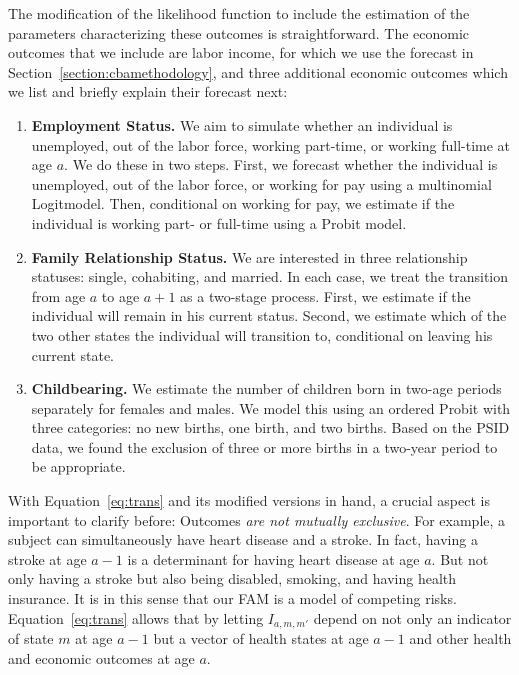 The modification of the likelihood function to include the estimation of the parameters characterizing these outcomes is straightforward. The economic outcomes that we include are labor income, for which we use the forecast in Section~\ref{section:cbamethodology}, and three additional economic outcomes which we list and briefly explain their forecast next:

\begin{enumerate}
\item \textbf{Employment Status.} We aim to simulate whether an individual is unemployed, out of the labor force, working part-time, or working full-time at age $a$. We do these in two steps. First, we forecast whether the individual is unemployed, out of
the labor force, or working for pay using a multinomial Logitmodel. Then, conditional on working for pay, we estimate if the individual is working part- or full-time using a Probit model.
\item \textbf{Family Relationship Status.} We are interested in three relationship statuses: single, cohabiting, and married. In each case, we treat the transition from age $a$ to age $a+1$ as a two-stage process. First, we estimate if the individual will remain in his current status. Second, we estimate which of the two other states the individual will transition to, conditional on leaving his current state.
\item \textbf{Childbearing.} We estimate the number of children born in two-age periods separately for females and males. We model this using an ordered Probit with three categories: no new births, one birth, and two births. Based on the PSID data, we found the exclusion of three or more births in a two-year period to be appropriate.
\end{enumerate}

With Equation~\eqref{eq:trans} and its modified versions in hand, a crucial aspect is important to clarify before: Outcomes \textit{are not mutually exclusive}. For example, a subject can simultaneously have heart disease and a stroke. In fact, having a stroke at age $a-1$ is a determinant for having heart disease at age $a$. But not only having a stroke but also being disabled, smoking, and having health insurance. It is in this sense that our FAM is a model of competing risks. Equation~\eqref{eq:trans} allows that by letting $I_{a,m,m'}$ depend on not only an indicator of state $m$ at age $a-1$ but a vector of health states at age $a-1$ and other health and economic outcomes at age $a$. 

